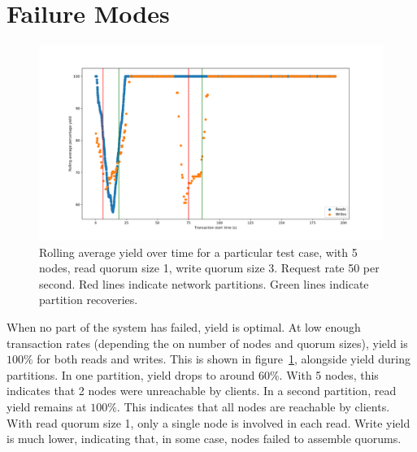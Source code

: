 \documentclass[12pt,a4paper,twoside,openany]{report}
\begin{document}
\section{Failure Modes}

\begin{figure}[htb]
\centerline{\includegraphics[width=\linewidth]{figs/eval-fig-3.png}}
\caption{Rolling average yield over time for a particular test case, with 5 nodes, read quorum size 1, write quorum size 3. Request rate 50 per second. Red lines indicate network partitions. Green lines indicate partition recoveries.}
\label{single-test-normal}
\end{figure}

When no part of the system has failed, yield is optimal. At low enough transaction rates (depending the on number of nodes and quorum sizes), yield is $100\%$ for both reads and writes. This is shown in figure~\ref{single-test-normal}, alongside yield during partitions. In one partition, yield drops to around $60\%$. With 5 nodes, this indicates that 2 nodes were unreachable by clients. In a second partition, read yield remains at $100\%$. This indicates that all nodes are reachable by clients. With read quorum size 1, only a single node is involved in each read. Write yield is much lower, indicating that, in some case, nodes failed to assemble quorums.
\end{document}
